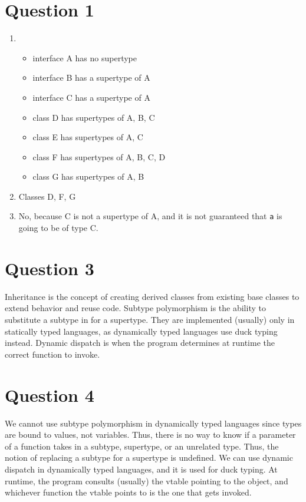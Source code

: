 \documentclass[13pt]{article}
\begin{document}
\section*{Question 1}
\begin{enumerate}[label=(\alph*)]
\item
  \begin{itemize}[label=,leftmargin=*]
  \item interface A has no supertype
  \item interface B has a supertype of A
  \item interface C has a supertype of A
  \item class D has supertypes of A, B, C
  \item class E has supertypes of A, C
  \item class F has supertypes of A, B, C, D
  \item class G has supertypes of A, B
  \end{itemize}
\item Classes D, F, G
\item No, because C is not a supertype of A, and it is not guaranteed
  that \texttt{a} is going to be of type C.
\end{enumerate}

\section*{Question 3}
Inheritance is the concept of creating derived classes from existing
base classes to extend behavior and reuse code. Subtype polymorphism
is the ability to substitute a subtype in for a supertype. They are
implemented (usually) only in statically typed languages, as
dynamically typed languages use duck typing instead. Dynamic dispatch
is when the program determines at runtime the correct function to
invoke.

\section*{Question 4}
We cannot use subtype polymorphism in dynamically typed languages
since types are bound to values, not variables. Thus, there is no way
to know if a parameter of a function takes in a subtype, supertype, or
an unrelated type. Thus, the notion of replacing a subtype for a
supertype is undefined. We can use dynamic dispatch in dynamically
typed languages, and it is used for duck typing. At runtime, the
program consults (usually) the vtable pointing to the object, and
whichever function the vtable points to is the one that gets invoked.
\end{document}

